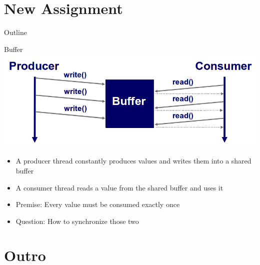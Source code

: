 \section{New Assignment}

\begin{frame}{Outline}
  \tableofcontents[current]
\end{frame}

\begin{frame}{Buffer}
  \includegraphics[width=\textwidth]{figures/buffer}


  \begin{itemize}
  \item A producer thread constantly produces values and writes them
    into a shared buffer
  \item A consumer thread reads a value from the shared buffer and
    uses it
  \item Premise: Every value must be consumed exactly once
  \item Question: How to synchronize those two
  \end{itemize}
\end{frame}


\section*{Outro}

